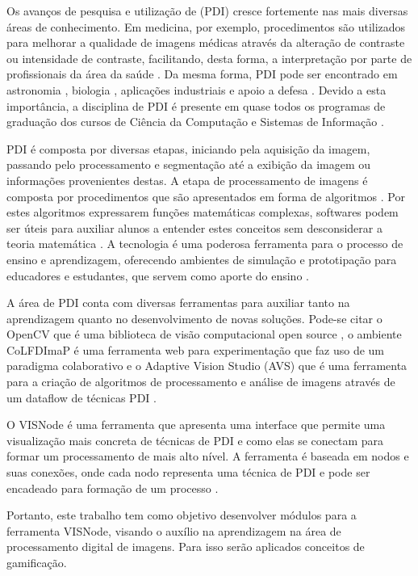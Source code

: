\documentclass[
	12pt,				%
	oneside,			%
	a4paper,			%
	english,			%
	french,				%
	spanish,			%
	brazil,				%
	]{abntex2}
\begin{document}
Os avanços de pesquisa e utilização de  (PDI) cresce fortemente nas mais diversas áreas de conhecimento. Em medicina, por exemplo, procedimentos são utilizados para melhorar a qualidade de imagens médicas através da alteração de contraste ou intensidade de contraste, facilitando, desta forma, a interpretação por parte de profissionais da área da saúde \cite{ronnau2015}. Da mesma forma, PDI pode ser encontrado em astronomia \cite{grice20153d}, biologia \cite{hardy2017advanced}, aplicações industriais \cite{dai2015advances} e apoio a defesa \cite{mendoza2016development}. Devido a esta importância, a disciplina de PDI é presente em quase todos os programas de graduação dos cursos de Ciência da Computação e Sistemas de Informação \cite{garcia2015colfdimap}.

PDI é composta por diversas etapas, iniciando pela aquisição da imagem, passando pelo processamento e segmentação até a exibição da imagem ou informações provenientes destas. A etapa de processamento de imagens é composta por procedimentos que são apresentados em forma de algoritmos \cite{gonzalesWoods:2008}. Por estes algoritmos expressarem funções matemáticas complexas, softwares podem ser úteis para auxiliar alunos a entender estes conceitos sem desconsiderar a teoria matemática \cite{lopez2016teaching}. A tecnologia é uma poderosa ferramenta para o processo de ensino e aprendizagem, oferecendo ambientes de simulação e prototipação para educadores e estudantes, que servem como aporte do ensino \cite{henderson2017works}.

A área de PDI conta com diversas ferramentas para auxiliar tanto na aprendizagem quanto no desenvolvimento de novas soluções. Pode-se citar o OpenCV que é uma biblioteca de visão computacional open source \cite{pulli2012realtime}, o ambiente CoLFDImaP é uma ferramenta web para experimentação que faz uso de um paradigma colaborativo \cite{garcia2015colfdimap} e o Adaptive Vision Studio (AVS) que é uma ferramenta para a criação de algoritmos de processamento e análise de imagens através de um dataflow de técnicas PDI \cite{radlak2015adaptive}.

O VISNode é uma ferramenta que apresenta uma interface que permite uma visualização mais concreta de técnicas de PDI e como elas se conectam para formar um processamento de mais alto nível. A ferramenta é baseada em nodos e suas conexões, onde cada nodo representa uma técnica de PDI e pode ser encadeado para formação de um processo \cite{visnode}.

Portanto, este trabalho tem como objetivo desenvolver módulos para a ferramenta VISNode, visando o auxílio na aprendizagem na área de processamento digital de imagens. Para isso serão aplicados conceitos de gamificação. 
\end{document}
